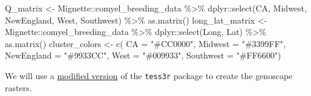 \documentclass[
]{book}
\newenvironment{Shaded}{\begin{snugshade}}{\end{snugshade}}
\newcommand{\AttributeTok}[1]{\textcolor[rgb]{0.77,0.63,0.00}{#1}}
\newcommand{\FunctionTok}[1]{\textcolor[rgb]{0.00,0.00,0.00}{#1}}
\newcommand{\NormalTok}[1]{#1}
\newcommand{\OtherTok}[1]{\textcolor[rgb]{0.56,0.35,0.01}{#1}}
\newcommand{\SpecialCharTok}[1]{\textcolor[rgb]{0.00,0.00,0.00}{#1}}
\newcommand{\StringTok}[1]{\textcolor[rgb]{0.31,0.60,0.02}{#1}}
\begin{document}
\begin{Shaded}
\begin{Highlighting}[]
\NormalTok{Q\_matrix }\OtherTok{\textless{}{-}}\NormalTok{ Mignette}\SpecialCharTok{::}\NormalTok{comyel\_breeding\_data }\SpecialCharTok{\%\textgreater{}\%}
\NormalTok{  dplyr}\SpecialCharTok{::}\FunctionTok{select}\NormalTok{(CA, Midwest, NewEngland, West, Southwest) }\SpecialCharTok{\%\textgreater{}\%}
  \FunctionTok{as.matrix}\NormalTok{()}
\NormalTok{long\_lat\_matrix }\OtherTok{\textless{}{-}}\NormalTok{ Mignette}\SpecialCharTok{::}\NormalTok{comyel\_breeding\_data }\SpecialCharTok{\%\textgreater{}\%}
\NormalTok{  dplyr}\SpecialCharTok{::}\FunctionTok{select}\NormalTok{(Long, Lat) }\SpecialCharTok{\%\textgreater{}\%}
  \FunctionTok{as.matrix}\NormalTok{()}
\NormalTok{cluster\_colors }\OtherTok{\textless{}{-}}  \FunctionTok{c}\NormalTok{(}
  \AttributeTok{CA =} \StringTok{"\#CC0000"}\NormalTok{,}
  \AttributeTok{Midwest =} \StringTok{"\#3399FF"}\NormalTok{,}
  \AttributeTok{NewEngland =} \StringTok{"\#9933CC"}\NormalTok{,}
  \AttributeTok{West =} \StringTok{"\#009933"}\NormalTok{,}
  \AttributeTok{Southwest =} \StringTok{"\#FF6600"}\NormalTok{) }
\end{Highlighting}
\end{Shaded}

We will use a \href{https://github.com/eriqande/TESS3_encho_sen}{modified version} of the \texttt{tess3r} package to create the genoscape rasters.
\end{document}
